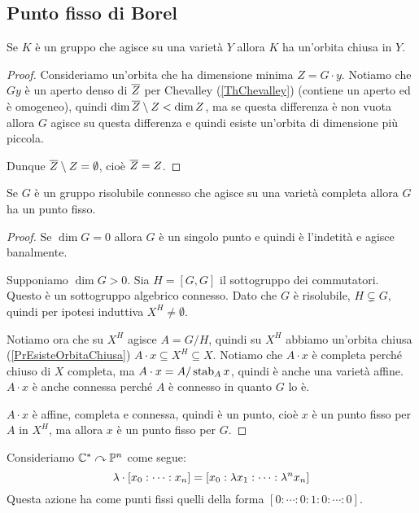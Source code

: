 \subsection{Punto fisso di Borel}
\begin{proposition}\label{PrEsisteOrbitaChiusa}
Se $K$ \`e un gruppo che agisce su una variet\`a $Y$ allora $K$ ha un'orbita chiusa in $Y$.
\end{proposition}
\begin{proof}
Consideriamo un'orbita che ha dimensione minima $Z=G\cdot y$. Notiamo che $Gy$ \`e un aperto denso di $\overline{Z}$ per Chevalley (\ref{ThChevalley}) (contiene un aperto ed \`e omogeneo), quindi $\dim \overline{Z}\setminus Z<\dim Z$, ma se questa differenza \`e non vuota allora $G$ agisce su questa differenza e quindi esiste un'orbita di dimensione pi\`u piccola.

Dunque $\overline{Z}\setminus Z=\emptyset$, cio\`e $\overline{Z}=Z$.
\end{proof}

\begin{theorem}\label{ThPuntoFissoBorel}
Se $G$ \`e un gruppo risolubile connesso che agisce su una variet\`a completa allora $G$ ha un punto fisso.
\end{theorem}
\begin{proof}
Se $\dim G=0$ allora $G$ \`e un singolo punto e quindi \`e l'indetit\`a e agisce banalmente.


Supponiamo $\dim G>0$. Sia $H=[G,G]$ il sottogruppo dei commutatori. Questo \`e un sottogruppo algebrico connesso. Dato che $G$ \`e risolubile, $H\subsetneq G$, quindi per ipotesi induttiva $X^H\neq \emptyset$.

Notiamo ora che su $X^H$ agisce $A=G/H$, quindi su $X^H$ abbiamo un'orbita chiusa (\ref{PrEsisteOrbitaChiusa}) $A\cdot x\subseteq X^H\subseteq X$. Notiamo che $A\cdot x$ \`e completa perch\'e chiuso di $X$ completa, ma $A\cdot x=A/\operatorname{stab}_A x$, quindi \`e anche una variet\`a affine. $A\cdot x$ \`e anche connessa perch\'e $A$ \`e connesso in quanto $G$ lo \`e.

$A\cdot x$ \`e affine, completa e connessa, quindi \`e un punto, cio\`e $x$ \`e un punto fisso per $A$ in $X^H$, ma allora $x$ \`e un punto fisso per $G$.
\end{proof}


\begin{example}
Consideriamo $\mathbb{C}^\ast\curvearrowright \mathbb{P}^n$ come segue:
\[\lambda\cdot [x_0:\cdots:x_n]=[x_0:\lambda x_1:\cdots:\lambda^n x_n]\]
Questa azione ha come punti fissi quelli della forma $[0:\cdots:0:1:0:\cdots:0]$.
\end{example}



